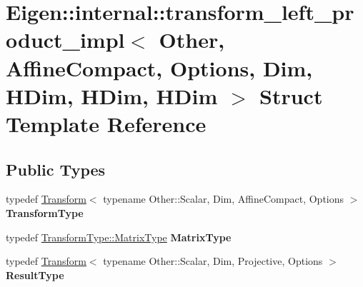 \hypertarget{struct_eigen_1_1internal_1_1transform__left__product__impl_3_01_other_00_01_affine_compact_00_01ed09886be52acac174d30c2c7403587b}{}\section{Eigen\+::internal\+::transform\+\_\+left\+\_\+product\+\_\+impl$<$ Other, Affine\+Compact, Options, Dim, H\+Dim, H\+Dim, H\+Dim $>$ Struct Template Reference}
\label{struct_eigen_1_1internal_1_1transform__left__product__impl_3_01_other_00_01_affine_compact_00_01ed09886be52acac174d30c2c7403587b}
\subsection*{Public Types}
\begin{DoxyCompactItemize}
\item 
\mbox{\label{struct_eigen_1_1internal_1_1transform__left__product__impl_3_01_other_00_01_affine_compact_00_01ed09886be52acac174d30c2c7403587b_afb7cffcf9ee2dfcb21ed434e507f1421}} 
typedef \mbox{\hyperlink{class_eigen_1_1_transform}{Transform}}$<$ typename Other\+::\+Scalar, Dim, Affine\+Compact, Options $>$ {\bfseries Transform\+Type}
\item 
\mbox{\label{struct_eigen_1_1internal_1_1transform__left__product__impl_3_01_other_00_01_affine_compact_00_01ed09886be52acac174d30c2c7403587b_a25762d347c9a2836052c3e9535c6548b}} 
typedef \mbox{\hyperlink{class_eigen_1_1_transform_a30f72ba46abc2bb3c7fa919c1078fc9c}{Transform\+Type\+::\+Matrix\+Type}} {\bfseries Matrix\+Type}
\item 
\mbox{\label{struct_eigen_1_1internal_1_1transform__left__product__impl_3_01_other_00_01_affine_compact_00_01ed09886be52acac174d30c2c7403587b_a67ebae5233155e876dd3a12a41782c88}} 
typedef \mbox{\hyperlink{class_eigen_1_1_transform}{Transform}}$<$ typename Other\+::\+Scalar, Dim, Projective, Options $>$ {\bfseries Result\+Type}
\end{DoxyCompactItemize}

